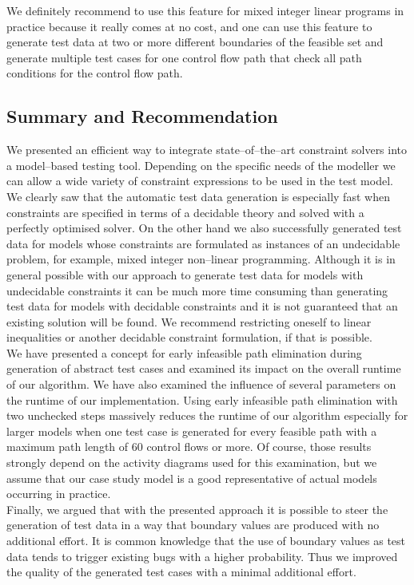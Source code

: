 \documentclass[runningheads,a4paper]{llncs}%
\begin{document}
We definitely recommend to use this feature for mixed integer linear programs in practice because it really comes at no cost, and one can use this feature to generate test data at two or more different boundaries of the feasible set and generate multiple test cases for one control flow path that check all path conditions for the control flow path.
\subsection{Summary and Recommendation}%
\label{sec:Recommendation}
We presented an efficient way to integrate state--of--the--art constraint solvers into a model--based testing tool. Depending on the specific needs of the modeller we can allow a wide variety of constraint expressions to be used in the test model. We clearly saw that the automatic test data generation is especially fast when constraints are specified in terms of a decidable theory and solved with a perfectly optimised solver. On the other hand we also successfully generated test data for models whose constraints are formulated as instances of an undecidable problem, for example, mixed integer non--linear programming. Although it is in general possible with our approach to generate test data for models with undecidable constraints it can be much more time consuming than generating test data for models with decidable constraints and it is not guaranteed that an existing solution will be found. We recommend restricting oneself to linear inequalities or another decidable constraint formulation, if that is possible.\\
We have presented a concept for early infeasible path elimination during generation of abstract test cases and examined its impact on the overall runtime of our algorithm. We have also examined the influence of several parameters on the runtime of our implementation. Using early infeasible path elimination with two unchecked steps massively reduces the runtime of our algorithm especially for larger models when one test case is generated for every feasible path with a maximum path length of 60 control flows or more. Of course, those results strongly depend on the activity diagrams used for this examination, but we assume that our case study model is a good representative of actual models occurring in practice.\\
Finally, we argued that with the presented approach it is possible to steer the generation of test data in a way that boundary values are produced with no additional effort. It is common knowledge that the use of boundary values as test data tends to trigger existing bugs with a higher probability. Thus we improved the quality of the generated test cases with a minimal additional effort.
%
%
\end{document}
